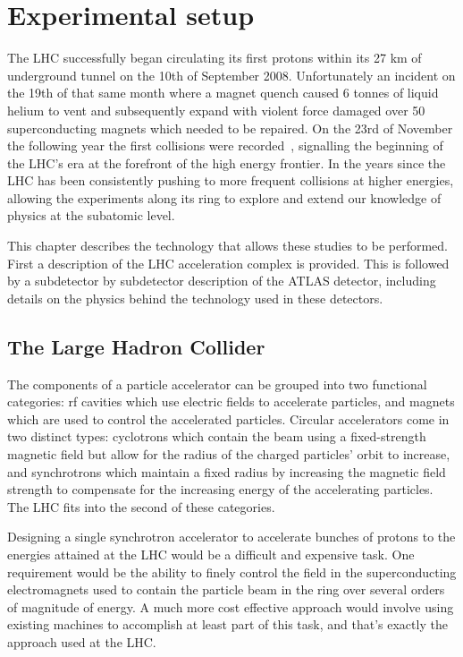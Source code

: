\chapter{Experimental setup}
\label{Experiment}
The \gls{LHC} successfully began circulating its first protons within its 27 km of underground tunnel on the 10th of September 2008.  
Unfortunately an incident on the 19th of that same month where a magnet quench caused 6 tonnes of liquid helium to vent and subsequently expand with violent force damaged over 50 superconducting magnets which needed to be repaired.   
On the 23rd of November the following year the first collisions were recorded~\cite{FirstCollisions}, signalling the beginning of the LHC's era at the forefront of the high energy frontier.  
In the years since the LHC has been consistently pushing to more frequent collisions at higher energies, allowing the experiments along its ring to explore and extend our knowledge of physics at the subatomic level.  

This chapter describes the technology that allows these studies to be performed.  
First a description of the LHC acceleration complex is provided.  
This is followed by a subdetector by subdetector description of the ATLAS detector, including details on the physics behind the technology used in these detectors.  

\section{The Large Hadron Collider}
\label{Sec:LHC}

The components of a particle accelerator can be grouped into two functional categories: rf cavities which use electric fields to accelerate particles, and magnets which are used to control the accelerated particles.  
Circular accelerators come in two distinct types: cyclotrons which contain the beam using a fixed-strength magnetic field but allow for the radius of the charged particles' orbit to increase, and synchrotrons which maintain a fixed radius by increasing the magnetic field strength to compensate for the increasing energy of the accelerating particles.  
The LHC fits into the second of these categories.  

Designing a single synchrotron accelerator to accelerate bunches of protons to the energies attained at the LHC would be a difficult and expensive task.
One requirement would be the ability to finely control the field in the superconducting electromagnets used to contain the particle beam in the ring over several orders of magnitude of energy.  
A much more cost effective approach would involve using existing machines to accomplish at least part of this task, and that's exactly the approach used at the LHC.  

